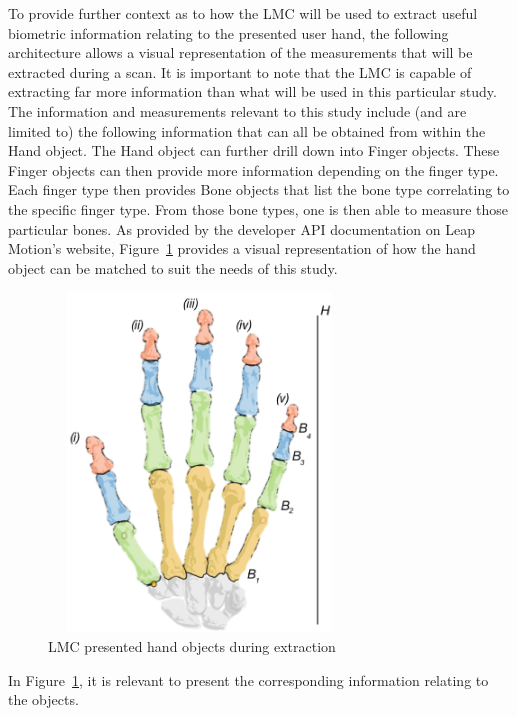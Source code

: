 To provide further context as to how the LMC will be used to extract useful biometric information relating to the presented user hand, the following architecture allows a visual representation of the measurements that will be extracted during a scan. It is important to note that the LMC is capable of extracting far more information than what will be used in this particular study. The information and measurements relevant to this study include (and are limited to) the following information that can all be obtained from within the Hand object. The Hand object can further drill down into Finger objects. These Finger objects can then provide more information depending on the finger type. Each finger type then provides Bone objects that list the bone type correlating to the specific finger type. From those bone types, one is then able to measure those particular bones.  As provided by the developer API documentation on Leap Motion’s website, Figure~\ref{fig:LMC presented hand objects during extraction} provides a visual representation of how the hand object can be matched to suit the needs of this study.

    
    \begin{figure}[htbp!] 
    \centering    
    \includegraphics[width=8cm,height=9cm,keepaspectratio]{Chapter3/Figs/LMC_presented_hand_objects_during_extraction.png}
    \caption[LMC presented hand objects during extraction]{LMC presented hand objects during extraction}
    \label{fig:LMC presented hand objects during extraction}
    \end{figure}

In Figure~\ref{fig:LMC presented hand objects during extraction}, it is relevant to present the corresponding information relating to the objects.

